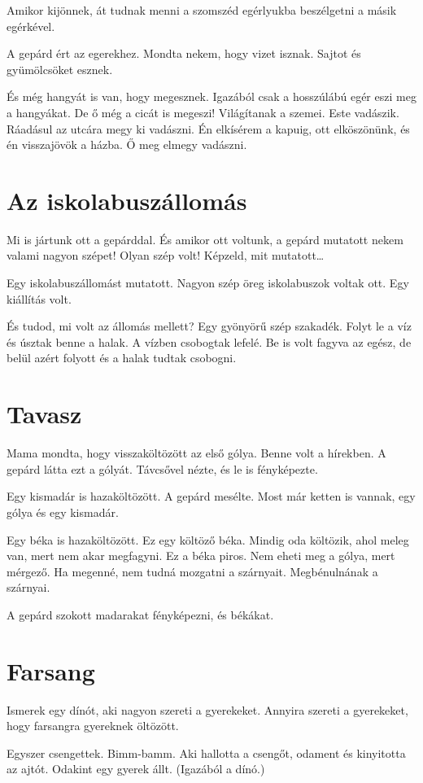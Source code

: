 \documentclass[12pt]{memoir}
\begin{document}
Amikor kijönnek, át tudnak menni a szomszéd egérlyukba beszélgetni a másik
egérkével.

A gepárd ért az egerekhez. Mondta nekem, hogy vizet isznak. Sajtot és
gyümölcsöket esznek.

És még hangyát is van, hogy megesznek. Igazából csak a hosszúlábú egér eszi meg
a hangyákat. De ő még a cicát is megeszi! Világítanak a szemei. Este vadászik.
Ráadásul az utcára megy ki vadászni. Én elkísérem a kapuig, ott elköszönünk, és
én visszajövök a házba. Ő meg elmegy vadászni.


\section{Az iskolabuszállomás}
Mi is jártunk ott a gepárddal. És amikor ott voltunk, a gepárd mutatott nekem
valami nagyon szépet! Olyan szép volt! Képzeld, mit mutatott…

Egy iskolabuszállomást mutatott. Nagyon szép öreg iskolabuszok voltak ott. Egy
kiállítás volt.

És tudod, mi volt az állomás mellett? Egy gyönyörű szép szakadék. Folyt le a
víz és úsztak benne a halak. A vízben csobogtak lefelé. Be is volt fagyva az
egész, de belül azért folyott és a halak tudtak csobogni.


\section{Tavasz}
Mama mondta, hogy visszaköltözött az első gólya. Benne volt a hírekben. A
gepárd látta ezt a gólyát. Távcsővel nézte, és le is fényképezte.

Egy kismadár is hazaköltözött. A gepárd mesélte. Most már ketten is vannak, egy
gólya és egy kismadár.

Egy béka is hazaköltözött. Ez egy költöző béka. Mindig oda költözik, ahol meleg
van, mert nem akar megfagyni. Ez a béka piros. Nem eheti meg a gólya, mert
mérgező. Ha megenné, nem tudná mozgatni a szárnyait. Megbénulnának a szárnyai.

A gepárd szokott madarakat fényképezni, és békákat.


\section{Farsang}
Ismerek egy dínót, aki nagyon szereti a gyerekeket. Annyira szereti a
gyerekeket, hogy farsangra gyereknek öltözött.

Egyszer csengettek. Bimm-bamm. Aki hallotta a csengőt, odament és kinyitotta az
ajtót. Odakint egy gyerek állt. (Igazából a dínó.)
\end{document}
